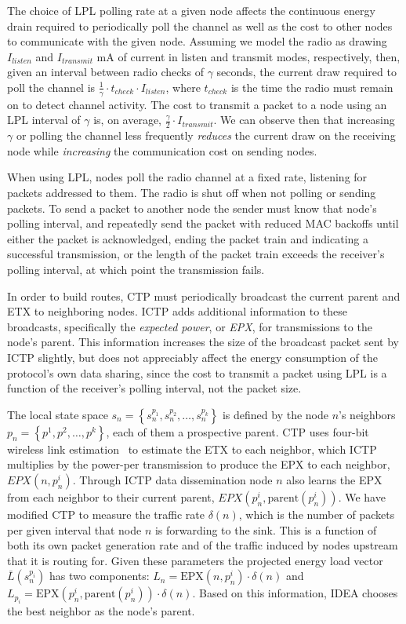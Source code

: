 The choice of LPL polling rate at a given node affects the continuous energy
drain required to periodically poll the channel as well as the cost to other
nodes to communicate with the given node. Assuming we model the radio as
drawing $I_{listen}$ and $I_{transmit}$ mA of current in listen and transmit
modes, respectively, then, given an interval between radio checks of $\gamma$
seconds, the current draw required to poll the channel is $\frac{1}{\gamma}
\cdot t_{check} \cdot I_{listen}$, where $t_{check}$ is the time the radio
must remain on to detect channel activity. The cost to transmit a packet to a
node using an LPL interval of $\gamma$ is, on average, $\frac{\gamma}{2}
\cdot I_{transmit}$. We can observe then that increasing $\gamma$ or polling
the channel less frequently \textit{reduces} the current draw on the
receiving node while \textit{increasing} the communication cost on sending
nodes.

When using LPL, nodes poll the radio channel at a fixed rate, listening for
packets addressed to them. The radio is shut off when not polling or sending
packets. To send a packet to another node the sender must know that node's
polling interval, and repeatedly send the packet with reduced MAC backoffs
until either the packet is acknowledged, ending the packet train and
indicating a successful transmission, or the length of the packet train
exceeds the receiver's polling interval, at which point the transmission
fails.

In order to build routes, CTP must periodically broadcast the current parent
and ETX to neighboring nodes. ICTP adds additional information to these
broadcasts, specifically the \textit{expected power}, or \textit{EPX}, for
transmissions to the node's parent. This information increases the size of
the broadcast packet sent by ICTP slightly, but does not appreciably affect
the energy consumption of the protocol's own data sharing, since the cost to
transmit a packet using LPL is a function of the receiver's polling interval,
not the packet size.

The local state space $s_n = \left\{s_n^{p_1}, s_n^{p_2}, \ldots, s_n^{p_k}
\right\}$ is defined by the node $n$'s neighbors $p_n = \left\{p^1, p^2,
\ldots, p^k \right\}$, each of them a prospective parent. CTP uses four-bit
wireless link estimation~\cite{Fonseca07} to estimate the ETX to each
neighbor, which ICTP multiplies by the power-per transmission to produce the
EPX to each neighbor, $EPX(n, p_n^i)$. Through ICTP data dissemination node
$n$ also learns the EPX from each neighbor to their current parent,
$EPX(p_n^i, \textrm{parent}(p_n^i))$. We have modified CTP to measure the
traffic rate $\delta(n)$, which is the number of packets per given interval
that node $n$ is forwarding to the sink. This is a function of both its own
packet generation rate and of the traffic induced by nodes upstream that it
is routing for. Given these parameters the projected energy load vector
$\bar{L}(s_n^{p_i})$ has two components: $L_n = \textrm{EPX}(n, p_n^i) \cdot
\delta(n)$ and $L_{p_i} = \textrm{EPX}(p_n^i, \textrm{parent}(p_n^i)) \cdot
\delta(n)$. Based on this information, IDEA chooses the best neighbor as the
node's parent.

